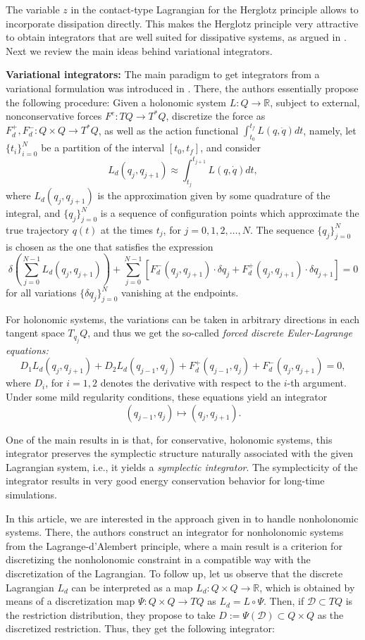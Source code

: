 \documentclass{aims}
\numberwithin{equation}{section}
\theoremstyle{definition}
\begin{document}
The variable $z$ in the contact-type Lagrangian for the Herglotz principle allows to incorporate dissipation directly. This makes the Herglotz principle very attractive to obtain integrators that are well suited for dissipative systems, as argued in \cite{vermeeren2019contact}. Next we review the main ideas behind variational integrators.

{\bf Variational integrators:} The main paradigm to get integrators from a variational formulation was introduced in \cite{wendlandt1997mechanical,marsden2001discrete}. There, the authors essentially propose the following procedure: Given a holonomic system $L\colon Q\to \mathbb{R}$, subject to external, nonconservative forces $F^e\colon TQ\to T^*Q$,  discretize the force as $F_d^+, F_d^-\colon Q\times Q\to T^*Q$, as well as the action functional $\int_{t_0}^{t_f}L(q, \dot{q})dt$, namely, let $\{t_i\}_{i=0}^N$ be a partition of the interval $[t_0, t_f]$, and consider 
\[L_d(q_j, q_{j+1})\approx \int_{t_j}^{t_{j+1}}L(q, \dot{q})dt,\]
where $L_d(q_j, q_{j+1})$ is the approximation  given by some quadrature of the integral, and $\{q_j\}_{j=0}^N$ is a sequence of configuration points which approximate the true trajectory $q(t)$ at the times $t_j$, for $j=0,1, 2,\ldots, N$. The sequence $\{q_j\}_{j=0}^N$ is chosen as the one that satisfies the expression
\[\delta\left(\sum_{j=0}^{N-1}L_d(q_j, q_{j+1})\right)+\sum_{j=0}^{N-1}[F_d^-(q_j, q_{j+1})\cdot \delta q_j+F_d^+(q_j, q_{j+1})\cdot \delta q_{j+1}] = 0\]
for all variations $\{\delta q_j\}_{j=0}^N$ vanishing at the endpoints.

For holonomic systems, the variations can be taken in arbitrary directions in each tangent space $T_{q_j}Q$, and thus we get the so-called {\it forced discrete Euler-Lagrange equations:}
\[D_1L_d(q_j, q_{j+1}) + D_2L_d(q_{j-1}, q_j) + F_d^+(q_{j-1}, q_j)+F_d^-(q_j, q_{j+1})= 0,\]
where $D_i$, for $i=1, 2$ denotes the derivative with respect to the $i$-th argument. Under some mild regularity conditions, these equations yield an integrator \[(q_{j-1}, q_{j})\mapsto (q_{j}, q_{j+1}).\]

One of the main results in \cite{marsden2001discrete} is that, for conservative, holonomic systems, this integrator preserves the symplectic structure naturally associated with the given Lagrangian system, i.e., it yields a {\it symplectic integrator}. The symplecticity of the integrator results in very good energy conservation behavior for long-time simulations. 

In this article, we are interested in the approach given in \cite{cortes2001non} to handle nonholonomic systems. There, the authors construct an integrator for nonholonomic systems from the Lagrange-d'Alembert principle, where a main result is a criterion for discretizing the nonholonomic constraint in a compatible way with the discretization of the Lagrangian. To follow up, let us observe that the discrete Lagrangian $L_d$ can be interpreted as a map $L_d \colon Q \times Q \to \mathbb{R}$, which is obtained by means of a discretization map $\Psi \colon Q\times Q \to TQ$ as $L_d = L \circ \Psi$. Then, if ${\mathcal D}\subset TQ$ is the restriction distribution, they propose to take $D:= \Psi({\mathcal D})\subset Q\times Q$ as the discretized restriction. Thus, they get the following integrator:
\end{document}
